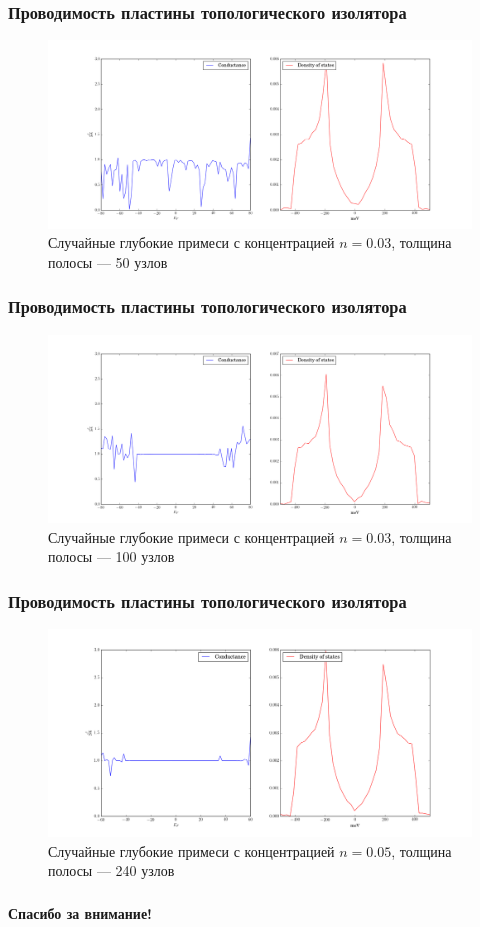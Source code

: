 \documentclass{beamer}
\begin{document}
\begin{frame}
    \frametitle{Проводимость пластины топологического изолятора}
    \begin{figure}[h]
        \centering
        \includegraphics[width=0.9\linewidth]{cond_and_density/prob_1000_0-030.png}
        \caption{Случайные глубокие примеси с концентрацией $n = 0.03$, 
                 толщина полосы --- 50 узлов}
    \end{figure}
\end{frame}

\begin{frame}
    \frametitle{Проводимость пластины топологического изолятора}
    \begin{figure}[h]
        \centering
        \includegraphics[width=0.9\linewidth]{cond_and_density_2/prob_1000_0-030.png}
        \caption{Случайные глубокие примеси с концентрацией $n = 0.03$, 
                 толщина полосы --- 100 узлов}
    \end{figure}
\end{frame}

\begin{frame}
    \frametitle{Проводимость пластины топологического изолятора}
    \begin{figure}[h]
        \centering
        \includegraphics[width=0.9\linewidth]{cond_and_density_2/prob_w120_1000_0-050.png}
        \caption{Случайные глубокие примеси с концентрацией $n = 0.05$, 
                 толщина полосы --- 240 узлов}
    \end{figure}
\end{frame}

\begin{frame}
    \frametitle{}
    \centering
    {\huge 
        \textbf{Спасибо за внимание!}
    }
\end{frame}
\end{document}
